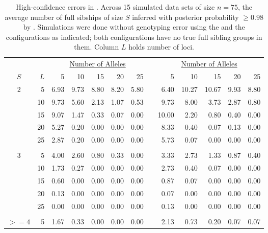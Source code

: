 \begin{table}[t!]
\caption{High-confidence errors in \colony{}. Across 15 simulated data sets of size $n=75$,
the average number of full sibships of size $S$ inferred with posterior probability $\geq 0.98$ by
\colony{}. Simulations were done without genotyping error using the \nosibs{} and the
\allhalf{} configurations as indicated; both configurations have no true full sibling groups in
them.  Column $L$ holds number of loci.  \label{tab:hiconf}  } 
\begin{center}
\begin{tabular}{crrrrrrrrrrrr}
\hline
                &      & \multicolumn{5}{c}{\underline{Number of Alleles}}      &    & \multicolumn{5}{c}{\underline{Number of Alleles}}       \\
	$S$			& $L$  &   5    &    10  &    15  &    20  &    25  &    &      5  &  10     &    15   &    20  &   25 \\ \hline
	2			&   5  &  6.93  &  9.73  &  8.80  &  8.20  &  5.80  &    &   6.40  &  10.27  &  10.67  &  9.93  &  8.80\\
				&  10  &  9.73  &  5.60  &  2.13  &  1.07  &  0.53  &    &   9.73  &   8.00  &   3.73  &  2.87  &  0.80\\
				&  15  &  9.07  &  1.47  &  0.33  &  0.07  &  0.00  &    &  10.00  &   2.20  &   0.80  &  0.40  &  0.00\\
				&  20  &  5.27  &  0.20  &  0.00  &  0.00  &  0.00  &    &   8.33  &   0.40  &   0.07  &  0.13  &  0.00\\
				&  25  &  2.87  &  0.20  &  0.00  &  0.00  &  0.00  &    &   5.73  &   0.07  &   0.00  &  0.00  &  0.00\\
			\\
	3			&   5  &  4.00  &  2.60  &  0.80  &  0.33  &  0.00  &    &   3.33  &   2.73  &   1.33  &  0.87  &  0.40\\
				&  10  &  1.73  &  0.27  &  0.00  &  0.00  &  0.00  &    &   2.73  &   0.40  &   0.07  &  0.00  &  0.00\\
				&  15  &  0.60  &  0.00  &  0.00  &  0.00  &  0.00  &    &   0.87  &   0.07  &   0.00  &  0.00  &  0.00\\
				&  20  &  0.13  &  0.00  &  0.00  &  0.00  &  0.00  &    &   0.07  &   0.00  &   0.00  &  0.00  &  0.00\\
				&  25  &  0.00  &  0.00  &  0.00  &  0.00  &  0.00  &    &   0.13  &   0.00  &   0.00  &  0.00  &  0.00\\
			\\ 
    $>=4$		   &   5  &  1.67  &  0.33  &  0.00  &  0.00  &  0.00  &    &   2.13  &   0.73  &   0.20  &  0.07  &  0.07\\

\end{tabular}
\end{center}
\end{table}
